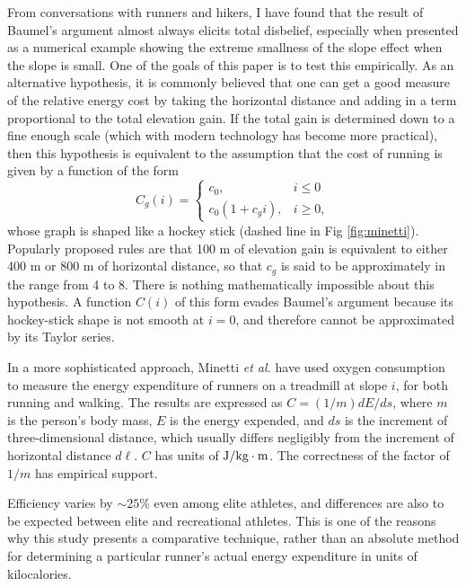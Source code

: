 \documentclass[10pt,letterpaper]{article}
\begin{document}
From conversations with runners and hikers, I have found that the result of Baumel's argument almost
always elicits total disbelief, especially when presented as a numerical example showing the extreme smallness
of the slope effect when the slope is small. One of the goals of this paper is to test this empirically.
As an alternative hypothesis, it is commonly believed that one can get a good measure
of the relative energy cost by taking the horizontal distance and adding in a term proportional to the total elevation gain.
If the total gain is determined down to a fine enough scale (which with modern technology has become
more practical), then this hypothesis is equivalent to the assumption that the cost of running is
given by a function of the form
\begin{equation}\label{eq:gain-only}
   C_g(i) = 
  \begin{cases}
     c_0, & i\le0 \\
     c_0(1+c_g i), & i\ge 0,
  \end{cases}
\end{equation}
whose graph is shaped like a hockey stick (dashed line in Fig \ref{fig:minetti}).
Popularly proposed rules are that 100 m of elevation gain is equivalent to either 400 m or 800 m of horizontal distance,
so that $c_g$ is said to be approximately in the range from 4 to 8. There is nothing mathematically impossible
about this hypothesis. A function $C(i)$ of this form evades Baumel's argument because its hockey-stick shape
is not smooth at $i=0$, and therefore cannot be approximated by its Taylor series.

In a more sophisticated approach, Minetti \emph{et al.}\cite{minetti} have used oxygen
consumption to measure the energy expenditure of runners on a treadmill at slope $i$, for both
running and walking.
The results are expressed as $C=(1/m)d E/d s$, where $m$ is the person's body mass,
$E$ is the energy expended, and $d s$ is the increment of three-dimensional distance, which
usually differs negligibly from the increment of horizontal distance $d \ell$.
$C$ has units of $\textup{J}/\textup{kg}\cdot\textup{m}$. The correctness of the factor
of $1/m$ has empirical support.\cite{shaw}

Efficiency varies by $\sim25\%$ even among elite athletes,\cite{minetti}\cite{lucia}
and differences are also to be expected between elite and recreational athletes. This is one
of the reasons why this study presents a comparative technique, rather than an absolute method for
determining a particular runner's actual energy expenditure in units of kilocalories.
\end{document}
